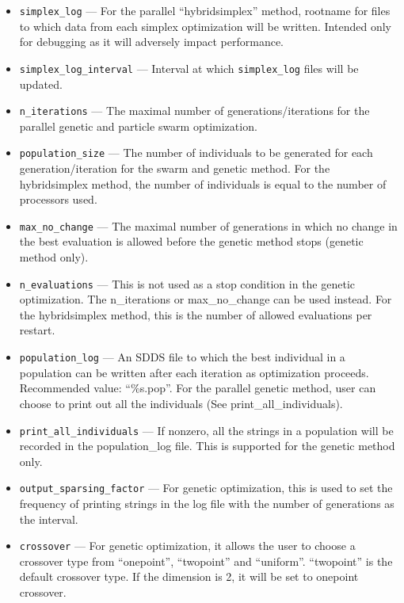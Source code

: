 \documentclass[11pt]{article}
\begin{document}
\begin{itemize}
\item \verb|simplex_log| --- For the parallel ``hybridsimplex'' method, rootname for files to which data from each simplex
  optimization will be written. Intended only for debugging as it will adversely impact performance.
\item \verb|simplex_log_interval| --- Interval at which \verb|simplex_log| files will be updated.

\item \verb|n_iterations| --- The maximal number of generations/iterations for the parallel genetic and particle swarm optimization. 

\item \verb|population_size| --- The number of individuals to be generated for each generation/iteration for the swarm and genetic method. For the hybridsimplex method, the number of individuals is equal to the number of processors used.

\item \verb|max_no_change| --- The maximal number of generations in which no change in the best evaluation is allowed before the genetic method stops (genetic method only).

\item \verb|n_evaluations| --- This is not used as a stop condition in the genetic optimization. The n\_iterations or max\_no\_change can be used instead. For the hybridsimplex method, this is the number of allowed evaluations per restart. 

\item \verb|population_log| --- An SDDS file to which the best individual in a population can be written after each iteration as optimization proceeds. Recommended value: ``\%s.pop''. For the parallel genetic method, user can choose to print out all the individuals (See print\_all\_individuals).

\item \verb|print_all_individuals| --- If nonzero, all the strings in a population will be recorded in the population\_log file. This is supported for the genetic method only.

\item \verb|output_sparsing_factor| --- For genetic optimization, this is used to set the frequency of printing strings in the log file with the number of generations as the interval.

\item \verb|crossover| --- For genetic optimization, it allows the user to choose a crossover type from ``onepoint'', ``twopoint'' and ``uniform''. ``twopoint'' is the default crossover type. If the dimension is 2, it will be set to onepoint crossover.

\end{itemize}
\end{document}
